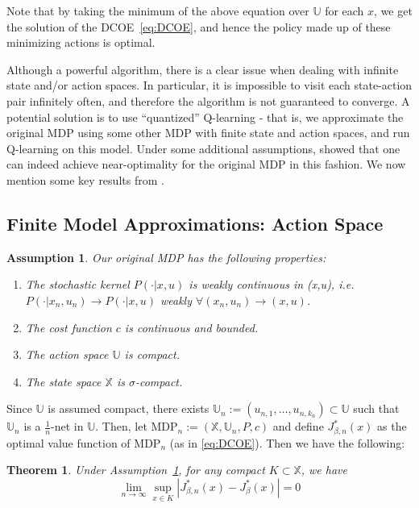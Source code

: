 \documentclass[conference]{IEEEtran}
\newtheorem{theorem}{Theorem}[section]
\newtheorem{assumption}{Assumption}[section]
\begin{document}
Note that by taking the minimum of the above equation over \(\mathbb{U}\) for each \(x\), we get the solution of the DCOE~\eqref{eq:DCOE}, and hence the policy made up of these minimizing actions is optimal.

Although a powerful algorithm, there is a clear issue when dealing with infinite state and/or action spaces. In particular, it is impossible to visit each state-action pair infinitely often, and therefore the algorithm is not guaranteed to converge. A potential solution is to use ``quantized'' Q-learning - that is, we approximate the original MDP using some other MDP with finite state and action spaces, and run Q-learning on this model. Under some additional assumptions, \cite{Kara} showed that one can indeed achieve near-optimality for the original MDP in this fashion. We now mention some key results from \cite{Kara}.

\subsection{Finite Model Approximations: Action Space}
\begin{assumption}\label{assumption:MDP} Our original MDP has the following properties:
    \begin{enumerate}
        \item The stochastic kernel \(P(\cdot | x,u)\) is weakly continuous in (x,u), i.e. \(P(\cdot | x_n,u_n) \to P(\cdot | x,u)\) weakly \(\forall (x_n,u_n) \to (x,u)\).
        \item The cost function \(c\) is continuous and bounded.
        \item The action space \(\mathbb{U}\) is compact.
        \item The state space \(\mathbb{X}\) is \(\sigma\)-compact.
    \end{enumerate}
\end{assumption}

Since \(\mathbb{U}\) is assumed compact, there exists \(\mathbb{U}_n := (u_{n,1},\ldots,u_{n,k_n}) \subset \mathbb{U}\) such that \(\mathbb{U}_n\) is a \(\frac{1}{n}\)-net in \(\mathbb{U}\). Then, let \(\text{MDP}_n := (\mathbb{X}, \mathbb{U}_n, P, c)\) and define \(J^*_{\beta,n}(x)\) as the optimal value function of \(\text{MDP}_n\) (as in \eqref{eq:DCOE}). Then we have the following:
\begin{theorem}\cite[Theorem 3.16]{Quantized_Models}
    Under Assumption~\ref{assumption:MDP}, for any compact \(K \subset \mathbb{X}\), we have
    \[ \lim_{n \to \infty}\sup_{x \in K}|J^*_{\beta,n}(x) - J^*_\beta(x)| = 0 \]
\end{theorem}
\end{document}
